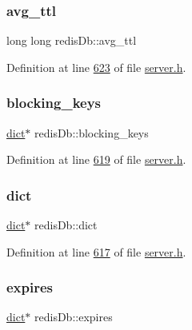 \subsubsection{\texorpdfstring{avg\+\_\+ttl}{avg\_ttl}}
{\footnotesize\ttfamily long long redis\+Db\+::avg\+\_\+ttl}



Definition at line \hyperlink{server_8h_source_l00623}{623} of file \hyperlink{server_8h_source}{server.\+h}.

\mbox{\label{structredisDb_af2a5d2caa663419eb274c9ff07356043}} 
\subsubsection{\texorpdfstring{blocking\+\_\+keys}{blocking\_keys}}
{\footnotesize\ttfamily \hyperlink{structdict}{dict}$\ast$ redis\+Db\+::blocking\+\_\+keys}



Definition at line \hyperlink{server_8h_source_l00619}{619} of file \hyperlink{server_8h_source}{server.\+h}.

\mbox{\label{structredisDb_a4aa609472e0e77d19c87c8a42d94f4a1}} 
\subsubsection{\texorpdfstring{dict}{dict}}
{\footnotesize\ttfamily \hyperlink{structdict}{dict}$\ast$ redis\+Db\+::dict}



Definition at line \hyperlink{server_8h_source_l00617}{617} of file \hyperlink{server_8h_source}{server.\+h}.

\mbox{\label{structredisDb_aad4a31e9cd97357d99a66c29bd189bc7}} 
\subsubsection{\texorpdfstring{expires}{expires}}
{\footnotesize\ttfamily \hyperlink{structdict}{dict}$\ast$ redis\+Db\+::expires}



